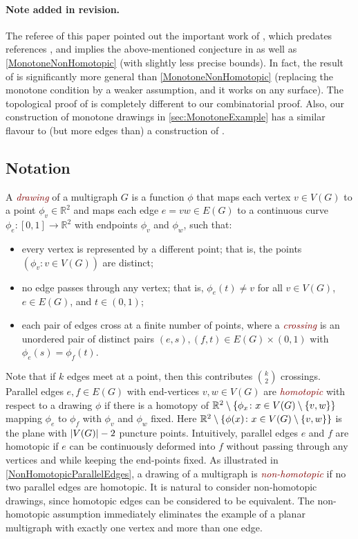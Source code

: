 \documentclass[a4paper,11pt]{article}
\DeclarePairedDelimiter{\abs}{\lvert}{\rvert} %
\DeclarePairedDelimiter{\set}{\lbrace}{\rbrace} %
\newcommand{\defn}[1]{\textcolor{Maroon}{\emph{#1}}}
\newcommand{\RR}{\mathbb{R}}
\begin{document}
\paragraph{Note added in revision.} The referee of this paper pointed out the important work of \citet[Thm.~1.2 \& 1.5]{Przytycki15}, which 
predates references \cite{PT20,KPTU21,FPS21}, and 
implies the above-mentioned conjecture in \cite{KPTU21} as well as \cref{MonotoneNonHomotopic}  (with slightly less precise bounds). In fact, the result of \citet{Przytycki15} is significantly more general than \cref{MonotoneNonHomotopic} (replacing the monotone condition by a weaker assumption, and it works on any surface).
The topological proof of \citet{Przytycki15} is completely different to our combinatorial proof. Also, our construction of monotone drawings in \cref{sec:MonotoneExample} has a similar flavour to (but more edges than) a construction of \citet[Example~4.1]{Przytycki15}. 

\subsection{Notation}\label{sec:notation}

A \defn{drawing} of a multigraph $G$ is a function $\phi$ that maps each vertex $v\in V(G)$ to a point $\phi_v \in \RR^2$ and maps each edge $e = vw\in E(G)$ to a continuous curve $\phi_e \colon [0, 1] \to \RR^2$ with endpoints $\phi_v$ and $\phi_w$, such that:
\begin{itemize}
    \item every vertex is represented by a different point; that is, the points $(\phi_v \colon v \in V(G))$ are distinct;
    \item no edge passes through any vertex; that is, $\phi_e(t) \neq v$ for all $v \in V(G)$, $e \in E(G)$, and $t \in (0, 1)$;
    \item each pair of edges cross at a finite number of points, where a \defn{crossing} is an unordered pair of distinct pairs $(e, s), (f, t) \in E(G) \times (0, 1)$ with $\phi_e(s) = \phi_f(t)$.
\end{itemize}

Note that if $k$ edges meet at a point, then this contributes $\binom{k}{2}$ crossings. Parallel edges $e,f\in E(G)$ with end-vertices $v,w\in V(G)$ are \defn{homotopic} with respect to a drawing $\phi$ if there is a homotopy of $\mathbb{R}^2\setminus\set{\phi_x \colon x \in V(G) \setminus \set{v,w}}$ mapping $\phi_e$ to $\phi_f$ with $\phi_v$ and $\phi_w$ fixed. Here $\mathbb{R}^2 \setminus \set{\phi(x) \colon x\in V(G)\setminus\set{v,w}}$ is the plane with $\abs{V(G)} - 2$ puncture points. Intuitively, parallel edges $e$ and $f$ are homotopic if $e$ can be continuously deformed into $f$ without passing through any vertices and while keeping the end-points fixed. As illustrated in \cref{NonHomotopicParallelEdges}, a drawing of a multigraph is \defn{non-homotopic} if no two parallel edges are homotopic. It is natural to consider non-homotopic drawings, since homotopic edges can be considered to be equivalent. The non-homotopic assumption immediately eliminates the example of a planar multigraph with exactly one vertex and more than one edge.
\end{document}
